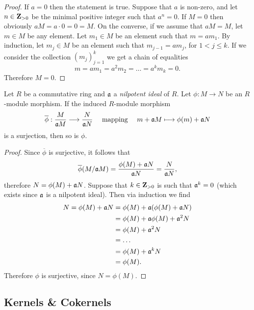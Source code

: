 \begin{proof}
If \(a = 0\) then the statement is true. Suppose that \(a\) is non-zero, and let
\(n \in \mathbf{Z}_{>0}\) be the minimal positive integer such that \(a^n = 0\). If
\(M = 0\) then obviously \(a M = a \cdot 0 = 0 = M\). On the converse, if we
assume that \(a M = M\), let \(m \in M\) be any element. Let \(m_1 \in M\) be an
element such that \(m = a m_1\). By induction, let \(m_j \in M\) be an element
such that \(m_{j-1} = a m_j\), for \(1 < j \leq k\). If we consider the
collection \((m_j)_{j=1}^k\) we get a chain of equalities
\[
m = a m_1 = a^2 m_2 = \dots = a^k m_k = 0.
\]
Therefore \(M = 0\).
\end{proof}

\begin{proposition}
\label{prop:induced-surjective-nilpotent-ideal}
Let \(R\) be a commutative ring and \(\mathfrak{a}\) a \emph{nilpotent ideal} of
\(R\). Let \(\phi: M \to N\) be an \(R\)-module morphism. If the induced
\(R\)-module morphism
\[
\overline{\phi}: \frac{M}{\mathfrak{a} M} \longrightarrow \frac{N}{\mathfrak{a} N}
\quad\text{ mapping }\quad
m + \mathfrak{a} M \longmapsto \phi(m) + \mathfrak{a} N
\]
is a surjection, then so is \(\phi\).
\end{proposition}

\begin{proof}
Since \(\overline{\phi}\) is surjective, it follows that
\[
\overline{\phi}(M/\mathfrak{a} M) = \frac{\phi(M) + \mathfrak{a} N}{\mathfrak{a} N}
= \frac{N}{\mathfrak{a} N},
\]
therefore \(N = \phi(M) + \mathfrak{a} N\). Suppose that \(k \in \mathbf{Z}_{> 0}\) is such
that \(\mathfrak{a}^k = 0\) (which exists since \(\mathfrak{a}\) is a nilpotent
ideal). Then via induction we find
\begin{align*}
  N = \phi(M) + \mathfrak{a} N
  &= \phi(M) + \mathfrak{a}(\phi(M) + \mathfrak{a} N) \\
  &= \phi(M) + \mathfrak{a} \phi(M) + \mathfrak{a}^2 N \\
  &= \phi(M) + \mathfrak{a}^2 N \\
  &= \dots \\
  &= \phi(M) + \mathfrak{a}^k N \\
  &= \phi(M).
\end{align*}
Therefore \(\phi\) is surjective, since \(N = \phi(M)\).
\end{proof}

\subsection{Kernels \& Cokernels}

